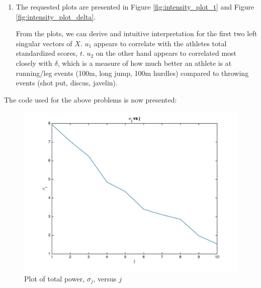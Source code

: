 \documentclass[12pt]{exam}
\begin{document}
\begin{questions}
\begin{solution}
\begin{enumerate}[label=(\alph*)]
      \item The requested plots are presented in Figure \ref{fig:intensity_plot_t} and Figure \ref{fig:intensity_plot_delta}.

      From the plots, we can derive and intuitive interpretation for the first two left singular vectors of $X$. $u_1$ appears to correlate with the athletes total standardized scores, $t$. $u_2$ on the other hand appears to correlated most closely with $\delta$, which is a measure of how much better an athlete is at running/leg events (100m, long jump, 100m hurdles) compared to throwing events (shot put, discus, javelin).

    \end{enumerate}
    The code used for the above problems is now presented:
    

  \end{solution}

  \begin{figure}[hpb!]
    \centering
    \includegraphics[scale=0.3]{data/sigma_vs_j.jpg}
    \caption{Plot of total power, $\sigma_j$, versus $j$}
    \label{fig:sigma_j_vs_j}
  \end{figure}


\end{questions}
\end{document}

